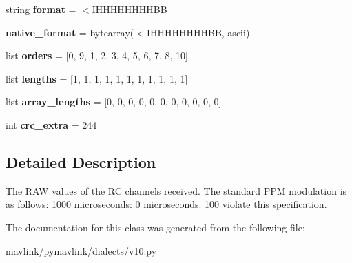 \begin{DoxyCompactItemize}
\item 
\mbox{\label{classpymavlink_1_1dialects_1_1v10_1_1MAVLink__rc__channels__raw__message_a4ce26324c06a51a81c917e55ade3736c}} 
string {\bfseries format} = \textquotesingle{}$<$I\+H\+H\+H\+H\+H\+H\+H\+H\+BB\textquotesingle{}
\item 
\mbox{\label{classpymavlink_1_1dialects_1_1v10_1_1MAVLink__rc__channels__raw__message_a42809d59d0347e7d3cd24b137f415986}} 
{\bfseries native\+\_\+format} = bytearray(\textquotesingle{}$<$I\+H\+H\+H\+H\+H\+H\+H\+H\+BB\textquotesingle{}, \textquotesingle{}ascii\textquotesingle{})
\item 
\mbox{\label{classpymavlink_1_1dialects_1_1v10_1_1MAVLink__rc__channels__raw__message_ae812f801d4cf0e63d2d15dea7fc24bae}} 
list {\bfseries orders} = \mbox{[}0, 9, 1, 2, 3, 4, 5, 6, 7, 8, 10\mbox{]}
\item 
\mbox{\label{classpymavlink_1_1dialects_1_1v10_1_1MAVLink__rc__channels__raw__message_a2a898991d4f9cc175dc71bd519fa9558}} 
list {\bfseries lengths} = \mbox{[}1, 1, 1, 1, 1, 1, 1, 1, 1, 1, 1\mbox{]}
\item 
\mbox{\label{classpymavlink_1_1dialects_1_1v10_1_1MAVLink__rc__channels__raw__message_a232e1a4274b6a9fd0f10e9c2ebe14222}} 
list {\bfseries array\+\_\+lengths} = \mbox{[}0, 0, 0, 0, 0, 0, 0, 0, 0, 0, 0\mbox{]}
\item 
\mbox{\label{classpymavlink_1_1dialects_1_1v10_1_1MAVLink__rc__channels__raw__message_a5098305aa70d5302eb4a43735a06657a}} 
int {\bfseries crc\+\_\+extra} = 244
\end{DoxyCompactItemize}


\subsection{Detailed Description}
\begin{DoxyVerb}The RAW values of the RC channels received. The standard PPM
modulation is as follows: 1000 microseconds: 0%
microseconds: 100%
violate this specification.
\end{DoxyVerb}
 

The documentation for this class was generated from the following file\+:\begin{DoxyCompactItemize}
\item 
mavlink/pymavlink/dialects/v10.\+py\end{DoxyCompactItemize}
